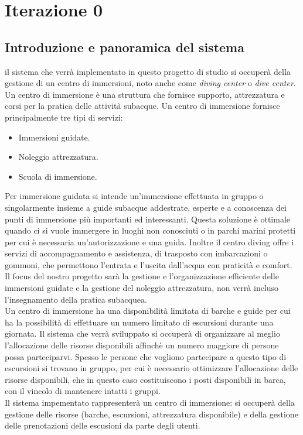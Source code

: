 \chapter{Iterazione 0}
\section{Introduzione e panoramica del sistema}
il sistema che verrà implementato in questo progetto di studio si occuperà della gestione di un centro di immersioni, noto anche come \emph{diving center} o \emph{dive center}. Un centro di immersione è una struttura che fornisce supporto, attrezzatura e corsi per la pratica delle attività subacque. Un centro di immersione fornisce principalmente tre tipi di servizi: 
\begin{itemize}
\item Immersioni guidate.
\item Noleggio attrezzatura.
\item Scuola di immersione. 
\end{itemize}
Per immersione guidata si intende un'immersione effettuata in gruppo o singolarmente insieme a guide subacque addestrate, esperte e a conoscenza dei punti di immersione più importanti ed interessanti. Questa soluzione è ottimale quando ci si vuole immergere in luoghi non conosciuti o in parchi marini protetti per cui è necessaria un'autorizzazione e una guida. Inoltre il centro diving offre i servizi di accompagnamento e assistenza, di trasposto con imbarcazioni o gommoni, che permettono l'entrata e l'uscita dall'acqua con praticità e comfort. 
\\
Il focus del nostro progetto sarà la gestione e l'organizzazione efficiente delle immersioni guidate e la gestione del noleggio attrezzatura, non verrà incluso l'insegnamento della pratica subacquea. 
\\
Un centro di immersione ha una disponibilità limitata di barche e guide per cui ha la possibilità di effettuare un numero limitato di escursioni durante una giornata. Il sistema che verrà sviluppato si occuperà di organizzare al meglio l'allocazione delle risorse disponibili affinchè un numero maggiore di persone possa parteciparvi. Spesso  le persone che vogliono partecipare a questo tipo di escursioni si trovano in gruppo, per cui è necessario ottimizzare l'allocazione delle risorse disponibili, che in questo caso costituiscono i posti disponibili in barca, con il vincolo di mantenere intatti i gruppi. 
\\
Il sistema impementato rappresenterà un centro di immersione: si occuperà della gestione delle risorse (barche, escursioni, attrezzatura disponibile) e della gestione delle prenotazioni delle escusioni da parte degli utenti.  

